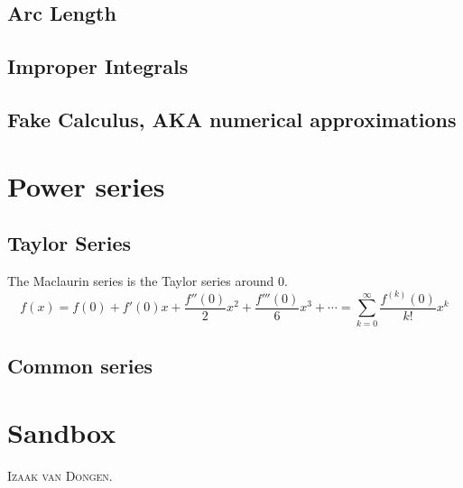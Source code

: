 \documentclass[fleqn,a4paper,11pt]{article}
\begin{document}
    \subsection{Arc Length}

    \subsection{Improper Integrals}


    \subsection{Fake Calculus, AKA numerical approximations}

    \section{Power series} %

    \subsection{Taylor Series}

    The Maclaurin series is the Taylor series around \(0\).
    \begin{equation}
    f(x) = f(0) + f'(0) x + \frac{f''(0)} 2 x^2 + \frac{f'''(0)}{6}x^3 +\dotsb
      = \sum_{k=0}^\infty \frac{f^{(k)}(0)}{k!}x^k
    \end{equation}

    \subsection{Common series}

    \section{Sandbox}

    \lettrine{\color{RoyalBlue4}I}{zaak van Dongen}. \lipsum[1]
\end{document}
